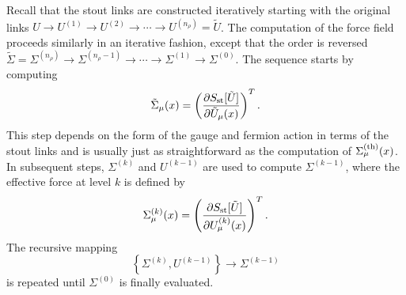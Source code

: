 Recall that the stout links are constructed iteratively starting
with the original links 
$U\rightarrow U^{(1)}\rightarrow U^{(2)}
 \rightarrow\cdots\rightarrow U^{(n_\rho)}=\tilde{U}$.  
The computation of the force field proceeds similarly in an
iterative fashion, except that the order is reversed
$\tilde\Sigma=\Sigma^{(n_\rho)}\rightarrow\Sigma^{(n_\rho\!-\!1)}
\rightarrow\cdots\rightarrow\Sigma^{(1)}\rightarrow\Sigma^{(0)}$.
The sequence starts by computing
\begin{equation}
 \tilde{\Sigma}_\mu(x)=\left(\frac{\partial S_{\rm st}[\tilde{U}]}{
  \partial \tilde{U}_\mu(x)}\right)^T.
\end{equation}
This step depends on the form of the gauge and fermion action in terms
of the stout links and is usually just as straightforward as the
computation of $\Sigma_\mu^{\rm(th)}(x)$.  In subsequent steps,
$\Sigma^{(k)}$ and $U^{(k\!-\!1)}$ are used to compute
$\Sigma^{(k\!-\!1)}$, where the effective force at level $k$ is
defined by
\begin{equation}
  \Sigma_\mu^{(k)}(x)=\left(\frac{\partial S_{\rm st}[\tilde{U}]}{
  \partial U_\mu^{(k)}(x)}\right)^T.
\end{equation}
The recursive mapping
\begin{equation}
   \left\{  \Sigma^{(k)}, U^{(k-1)}\right\} 
  \longrightarrow \Sigma^{(k-1)}
 \label{eq:mapping}
\end{equation}
is repeated until $\Sigma^{(0)}$ is finally evaluated.

